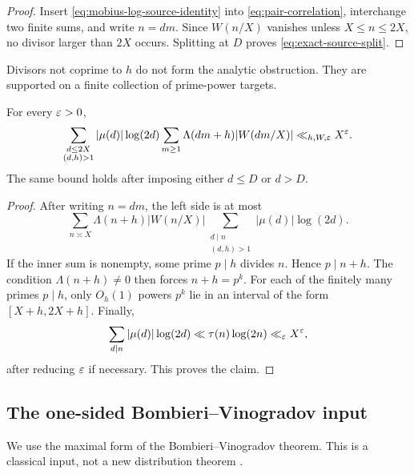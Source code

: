 \begin{proof}
Insert \eqref{eq:mobius-log-source-identity} into
\eqref{eq:pair-correlation}, interchange two finite sums, and
write $n=dm$.  Since $W(n/X)$ vanishes unless $X\leq n\leq2X$, no divisor
larger than $2X$ occurs.  Splitting at $D$ proves
\eqref{eq:exact-source-split}.
\end{proof}

Divisors not coprime to $h$ do not form the analytic obstruction.  They are
supported on a finite collection of prime-power targets.

\begin{lemma}
\label{lem:noncoprime-source-part}
For every $\varepsilon>0$,
\begin{equation}\label{eq:noncoprime-source-bound}
 \sum_{\substack{d\leq2X\\(d,h)>1}}
 |\mu(d)|\log(2d)
 \sum_{m\geq1}\Lambda(dm+h)|W(dm/X)|
 \ll_{h,W,\varepsilon}X^\varepsilon.
\end{equation}
The same bound holds after imposing either $d\leq D$ or $d>D$.
\end{lemma}

\begin{proof}
After writing $n=dm$, the left side is at most
\[
 \sum_{n\asymp X}\Lambda(n+h)|W(n/X)|
 \sum_{\substack{d\mid n\\(d,h)>1}}|\mu(d)|\log(2d).
\]
If the inner sum is nonempty, some prime $p\mid h$ divides $n$.  Hence
$p\mid n+h$.  The condition $\Lambda(n+h)\ne0$ then forces
$n+h=p^k$.  For each of the finitely many primes $p\mid h$, only
$O_h(1)$ powers $p^k$ lie in an interval of the form $[X+h,2X+h]$.
Finally,
\[
 \sum_{d\mid n}|\mu(d)|\log(2d)
 \ll \tau(n)\log(2n)\ll_\varepsilon X^\varepsilon,
\]
after reducing $\varepsilon$ if necessary.  This proves the claim.
\end{proof}

\subsection{The one-sided Bombieri--Vinogradov input}
\label{subsec:one-sided-bv}

We use the maximal form of the Bombieri--Vinogradov theorem.  This is a
classical input, not a new distribution theorem
\citep{Bombieri1965,Vinogradov1965,IwaniecKowalski2004}.

